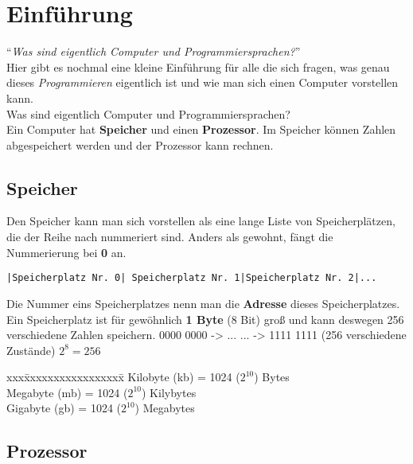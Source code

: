 \documentclass[c_worksheet.tex]{subfiles}
\begin{document}
\chapter{Einführung}

``\textit{Was sind eigentlich Computer und Programmiersprachen?}''\\
Hier gibt es nochmal eine kleine Einführung für alle die sich fragen, was genau dieses \textit{Programmieren} eigentlich ist und wie man sich einen Computer vorstellen kann.\\
Was sind eigentlich Computer und Programmiersprachen? \\
Ein Computer hat \textbf{Speicher} und einen \textbf{Prozessor}. Im Speicher können Zahlen abgespeichert werden und der Prozessor kann rechnen. \\

\section{Speicher}

Den Speicher kann man sich vorstellen als eine lange Liste von Speicherplätzen, die der Reihe nach nummeriert sind. Anders als gewohnt, fängt die Nummerierung bei \textbf{0} an. \\

\begin{lstlisting}[numbers=none, backgroundcolor=\color{lightgray}, frame=lrtb]
|Speicherplatz Nr. 0| Speicherplatz Nr. 1|Speicherplatz Nr. 2|...
\end{lstlisting}

\vspace{3pt}
Die Nummer eins Speicherplatzes nenn man die \textbf{Adresse} dieses Speicherplatzes. \\
Ein Speicherplatz ist für gewöhnlich \textbf{1 Byte} (8 Bit) groß und kann deswegen 256 verschiedene Zahlen speichern.
0000 0000 -> ...  ... -> 1111 1111 (256 verschiedene Zustände) $2^8 = 256$ \\

\begin{tabbing}
xxx\=xxxxxxxxxxxxxxxxx\=  \kill
{} Kilobyte (kb) \>= 1024 ($2^{10}$) Bytes\\
 Megabyte (mb) \>= 1024 ($2^{10}$) Kilybytes\\
 Gigabyte (gb) \>= 1024 ($2^{10}$) Megabytes\\
\end{tabbing}

\newpage
\section{Prozessor}
\end{document}
